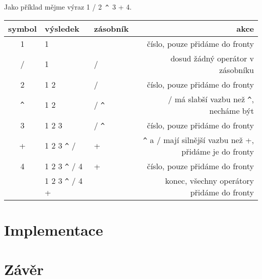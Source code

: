 \documentclass[11pt]{article}
\begin{document}
Jako příklad mějme výraz 1 / 2~\verb|^|~3 + 4.
\begin{center}
\begin{tabular}{|c|l|l|r|}
\hline
symbol & výsledek & zásobník & akce \\
\hline
1 & 1 & & číslo, pouze přidáme do fronty \\
/ & 1 & / & dosud žádný operátor v zásobníku\\
2 & 1 2 & / & číslo, pouze přidáme do fronty \\
\verb|^| & 1 2 & / \verb|^| & / má slabší vazbu než \verb|^|, necháme být \\
3 & 1 2 3 & / \verb|^| & číslo, pouze přidáme do fronty \\
+ & 1 2 3 \verb|^| / & + & \verb|^| a / mají silnější vazbu než +, 
přidáme je do fronty\\
4 & 1 2 3 \verb|^| / 4 & + & číslo, pouze přidáme do fronty \\
  & 1 2 3 \verb|^| / 4 + & & konec, všechny operátory přidáme do fronty \\

\hline
\end{tabular}
\end{center}



\section{Implementace}
\section{Závěr}
\end{document}

